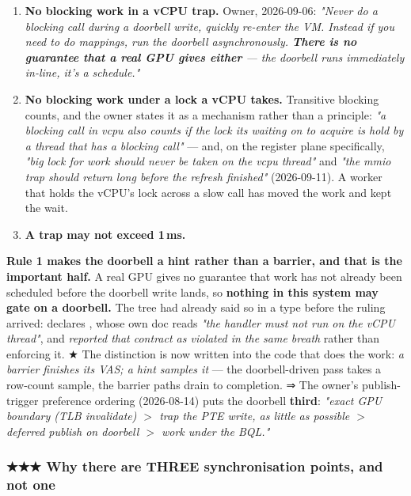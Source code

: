 \documentclass[10.5pt]{article}
\begin{document}
\begin{claimbox}\small
\begin{enumerate}[itemsep=0.3ex]
\item \textbf{No blocking work in a vCPU trap.} Owner, 2026-09-06: \emph{"Never do a blocking
  call during a doorbell write, quickly re-enter the VM. Instead if you need to do mappings, run
  the doorbell asynchronously. \textbf{There is no guarantee that a real GPU gives either} ---
  the doorbell runs immediately in-line, it's a schedule."}
\item \textbf{No blocking work under a lock a vCPU takes.} Transitive blocking counts, and the
  owner states it as a mechanism rather than a principle: \emph{"a blocking call in vcpu also
  counts if the lock its waiting on to acquire is hold by a thread that has a blocking call"} ---
  and, on the register plane specifically, \emph{"big lock for work should never be taken on the
  vcpu thread"} and \emph{"the mmio trap should return long before the refresh finished"}
  (2026-09-11). A worker that holds the vCPU's lock across a slow call has moved the work and kept
  the wait.
\item \textbf{A trap may not exceed 1\,ms.}
\end{enumerate}
\end{claimbox}

\textbf{Rule 1 makes the doorbell a hint rather than a barrier, and that is the important
half.} A real GPU gives no guarantee that work has not already been scheduled before the doorbell
write lands, so \textbf{nothing in this system may gate on a doorbell.} The tree had already said
so in a type before the ruling arrived:  declares
, whose own doc reads \emph{"the handler must not run on the
vCPU thread"}, and  \emph{reported that contract as
violated in the same breath} rather than enforcing it. ★ The distinction is now written into the
code that does the work: \emph{a barrier finishes its VAS; a hint samples it} --- the
doorbell-driven pass takes a row-count sample, the barrier paths drain to completion.
⇒ The owner's publish-trigger preference ordering (2026-08-14) puts the doorbell \textbf{third}:
\emph{"exact GPU boundary (TLB invalidate) $>$ trap the PTE write, as little as possible $>$
deferred publish on doorbell $>$ work under the BQL."}

\subsubsection*{★★★ Why there are THREE synchronisation points, and not one}
\end{document}
